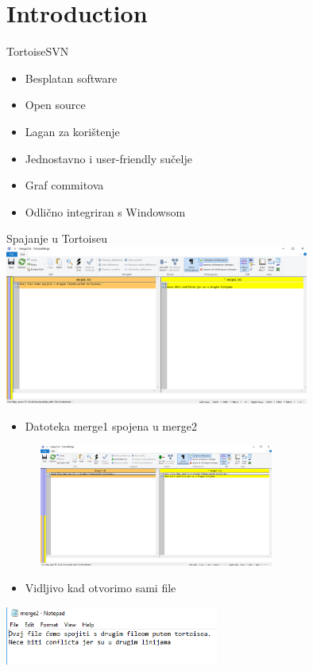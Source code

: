 \documentclass{beamer}
\begin{document}
\maketitle

\section{Introduction}
\begin{frame}{TortoiseSVN}
\begin{itemize}
    \item Besplatan software
    \item Open source
    \item Lagan za korištenje
    \item Jednostavno i user-friendly sučelje
    \item Graf commitova
    \item Odlično integriran s Windowsom
    
    
\end{itemize}
    
\end{frame}
\begin{frame}{Spajanje u Tortoiseu}
\includegraphics[width=10cm]{tortoise1.png}
\end{frame}
\begin{frame}
\begin{itemize}
    \item\small{Datoteka merge1 spojena u merge2}
\end{itemize}
\includegraphics[height=4cm, width=10cm]{tortoise2.png}\newline
\begin{itemize}
    \item\small{Vidljivo kad otvorimo sami file}
\end{itemize}
\includegraphics[width=7cm]{tortoise3.png}
\end{frame}
\end{document}
